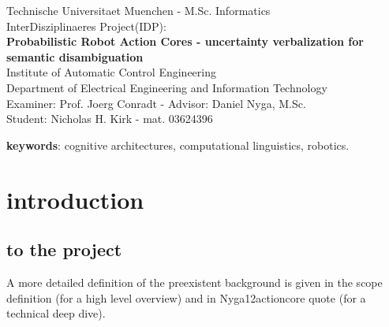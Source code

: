 \documentclass[10pt,a4paper]{article}
\begin{document}
\begin{center}
\large{{Technische Universitaet Muenchen} - M.Sc. Informatics }\\ \Large{ InterDisziplinaeres Project(IDP):\\ \textbf{Probabilistic Robot Action Cores - uncertainty verbalization for semantic disambiguation}
}\\
\normalsize{{Institute of Automatic Control Engineering}} \\
\normalsize{{Department of Electrical Engineering and Information Technology}}\\

\small{{Examiner: Prof. Joerg Conradt}} - \small{{Advisor: Daniel Nyga, M.Sc.}}\\
\normalsize{{Student: Nicholas H. Kirk - mat. 03624396}} \\

\end{center}

\vspace{2 mm}

\begin{center}
 \textbf{keywords}: cognitive architectures, computational linguistics, robotics.
\end{center}
\vspace{2 mm}

\begin{multicols}{2}
\tableofcontents

\end{multicols}

\section{introduction}
\subsection{to the project}
A more detailed definition of the preexistent background is given in the scope definition (for a high level overview) and in Nyga12actioncore quote (for a technical deep dive).
\end{document}
